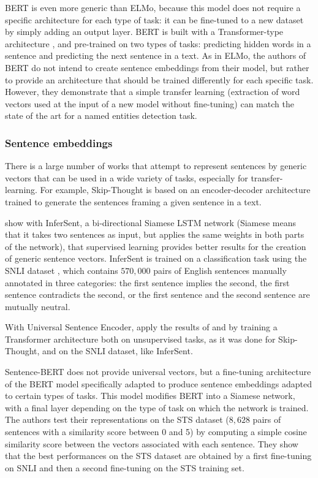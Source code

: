 BERT \cite{devlin2018bert} is even more generic than ELMo, because this model does not require a specific architecture for each type of task: it can be fine-tuned to a new dataset by simply adding an output layer. BERT is built with a Transformer-type architecture \cite{vaswani2017attention}, and pre-trained on two types of tasks: predicting hidden words in a sentence and predicting the next sentence in a text. As in ELMo, the authors of BERT do not intend to create sentence embeddings from their model, but rather to provide an architecture that should be trained differently for each specific task. However, they demonstrate that a simple transfer learning (extraction of  word vectors used at the input of a new model without fine-tuning) can match the state of the art for a named entities detection task.

\subsubsection{Sentence embeddings}
\label{embedding_phrases}
There is a large number of works that attempt to represent sentences by generic vectors that can be used in a wide variety of tasks, especially for transfer-learning. 
For example, Skip-Thought \citep{kiros2015skip} is based on an encoder-decoder architecture trained to generate the sentences framing a given sentence in a text.

\citet{conneau2017supervised} show with InferSent, a bi-directional Siamese LSTM network (Siamese means that it takes two sentences as input, but applies the same weights in both parts of the network), that supervised learning provides better results for the creation of generic sentence vectors. InferSent is trained on a classification task using the SNLI dataset \cite{bowman2015large}, which contains $570,000$ pairs of English sentences manually annotated in three categories: the first sentence implies the second, the first sentence contradicts the second, or the first sentence and the second sentence are mutually neutral.

With Universal Sentence Encoder, \citet{cer2018universal} apply the results of \citet{kiros2015skip} and \citet{conneau2017supervised} by training a Transformer architecture both on unsupervised tasks, as it was done for Skip-Thought, and on the SNLI dataset, like InferSent. 

Sentence-BERT \cite{reimers_2019_sentence} does not provide universal vectors, but a fine-tuning architecture of the BERT model specifically adapted to produce sentence embeddings adapted to certain types of tasks. This model modifies BERT into a Siamese network, with a final layer depending on the type of task on which the network is trained. The authors test their representations on the STS dataset \cite{cer2017semeval} ($8,628$ pairs of sentences with a similarity score between 0 and 5) by computing a simple cosine similarity score between the vectors associated with each sentence. They show that the best performances on the STS dataset are obtained by a first fine-tuning on SNLI and then a second fine-tuning on the STS training set.


